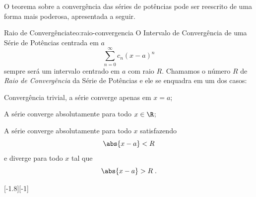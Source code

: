O teorema sobre a convergência das séries de potências pode ser
reescrito de uma forma mais poderosa, apresentada a seguir.

\begin{teorema}{Raio de Convergência}{teo:raio-convergencia}
  O Intervalo de Convergência de uma
  Série de Potências centrada em $a$
  \[
  	\sum_{n=0}^\infty c_n(x-a)^n
 	\]
  sempre será um intervalo centrado em $a$ com raio $R$.
  Chamamos o número $R$ de
  \emph{Raio de Convergência}%
  da Série de Potências e ele se enquadra em um dos casos:
  \begin{description}[leftmargin=10mm, labelwidth=17mm, itemindent=20mm]
    \item[$R=0$]      Convergência trivial, a série converge apenas em $x=a$;
    \item[$R=\infty$] A série converge absolutamente para todo $x\in\R$;
    \item[$R>0$]      A série converge absolutamente para todo $x$ satisfazendo
      \[
        \abs{x-a}<R
      \]
      e diverge para todo $x$ tal que
      \[
       \abs{x-a}>R   \;.
      \]
  \end{description}
  [-1.8][-1]
\end{teorema}
